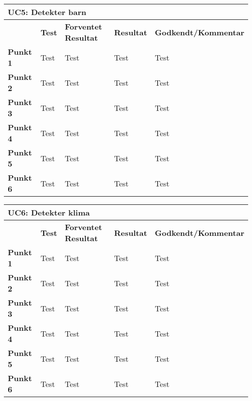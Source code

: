 \begin{table}[htbp] \centering
\begin{tabular}{|l|l|l|l|l|} %
	\hline
\multicolumn{5}{|l|}{\textbf{UC5: Detekter barn}} \\\hline
	&\textbf{Test} &\textbf{Forventet Resultat} &\textbf{Resultat} &\textbf{Godkendt/Kommentar} \\\hline
\textbf{Punkt 1}		&Test	&Test 	&Test	&Test \\\hline
\textbf{Punkt 2}		&Test	&Test 	&Test	&Test \\\hline
\textbf{Punkt 3}		&Test	&Test 	&Test	&Test \\\hline
\textbf{Punkt 4}		&Test	&Test 	&Test	&Test \\\hline
\textbf{Punkt 5}		&Test	&Test 	&Test	&Test \\\hline
\textbf{Punkt 6}		&Test	&Test 	&Test	&Test \\\hline
	\end{tabular}
	\label{ATUC5} 
\end{table}

\begin{table}[htbp] \centering
\begin{tabular}{|l|l|l|l|l|} %
	\hline
\multicolumn{5}{|l|}{\textbf{UC6: Detekter klima}} \\\hline
	&\textbf{Test} &\textbf{Forventet Resultat} &\textbf{Resultat} &\textbf{Godkendt/Kommentar} \\\hline
\textbf{Punkt 1}		&Test	&Test 	&Test	&Test \\\hline
\textbf{Punkt 2}		&Test	&Test 	&Test	&Test \\\hline
\textbf{Punkt 3}		&Test	&Test 	&Test	&Test \\\hline
\textbf{Punkt 4}		&Test	&Test 	&Test	&Test \\\hline
\textbf{Punkt 5}		&Test	&Test 	&Test	&Test \\\hline
\textbf{Punkt 6}		&Test	&Test 	&Test	&Test \\\hline
	\end{tabular}
	\label{ATUC6} 
\end{table}

